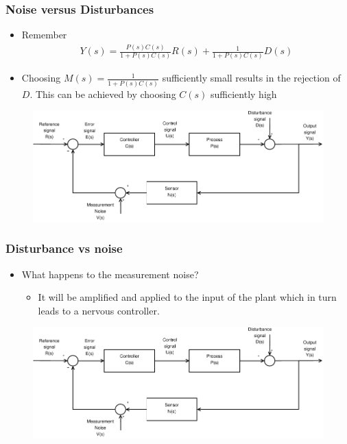 \begin{frame}
	\frametitle{Noise versus Disturbances}
	\begin{block}{}
		\begin{itemize}
			\item Remember
			\begin{align*}
				Y(s) = \frac{P(s)C(s)}{1+P(s)C(s)}R(s) + \frac{1}{1+P(s)C(s)}D(s)
			\end{align*}
			\item Choosing $M(s)=\frac{1}{1+P(s)C(s)}$ sufficiently small results in the rejection of $D$. This can be achieved by choosing $C(s)$ sufficiently high
		\end{itemize}
		\vspace{-2em}
		\begin{figure}
			\centering
			\includegraphics[width=0.7\linewidth]{Closed-Loop-measure}
			\label{fig:Closed-Loop4}
		\end{figure}
	\end{block}
\end{frame}


\begin{frame}
	\frametitle{Disturbance vs noise}
	\begin{block}{}
		\begin{itemize}
			\item What happens to the measurement noise?
			\begin{itemize}
				\item It will be amplified and applied to the input of the plant which in turn leads to a nervous controller.
			\end{itemize}
		\end{itemize}
		\begin{figure}
			\centering
			\includegraphics[width=0.8\linewidth]{Closed-Loop-measure}
			\label{fig:Closed-Loop5}
		\end{figure}
	\end{block}
\end{frame}


